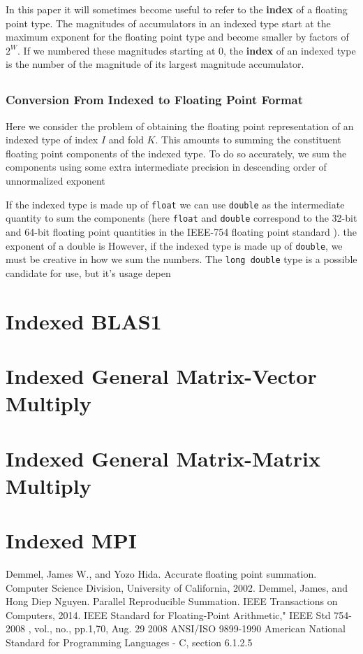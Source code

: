 \documentclass[12pt]{article}
\begin{document}
    In this paper it will sometimes become useful to refer to the \textbf{index} of a floating point type. The magnitudes of accumulators in an indexed type start at the maximum exponent for the floating point type and become smaller by factors of $2^W$. If we numbered these magnitudes starting at 0, the \textbf{index} of an indexed type is the number of the magnitude of its largest magnitude accumulator.
  \subsection{}
    
  \subsubsection{Conversion From Indexed to Floating Point Format}
    Here we consider the problem of obtaining the floating point representation of an indexed type of index $I$ and fold $K$. This amounts to summing the constituent floating point components of the indexed type. To do so accurately, we sum the components using some extra intermediate precision in descending order of unnormalized exponent
    
    If the indexed type is made up of \verb|float| we can use \verb|double| as the intermediate quantity to sum the components (here \verb|float| and \verb|double| correspond to the 32-bit and 64-bit floating point quantities in the IEEE-754 floating point standard \cite{ieee754}). the exponent of a double is However, if the indexed type is made up of \verb|double|, we must be creative in how we sum the numbers. The \verb|long double| type is a possible candidate for use, but it's usage depen
\section{Indexed BLAS1}
\section{Indexed General Matrix-Vector Multiply}
\section{Indexed General Matrix-Matrix Multiply}
\section{Indexed MPI}
\begin{thebibliography}{9}
    Demmel, James W., and Yozo Hida. Accurate floating point summation. Computer Science Division, University of California, 2002.
    Demmel, James, and Hong Diep Nguyen. Parallel Reproducible Summation. IEEE Transactions on Computers, 2014.
    IEEE Standard for Floating-Point Arithmetic," IEEE Std 754-2008 , vol., no., pp.1,70, Aug. 29 2008
    ANSI/ISO 9899-1990 American National Standard for Programming Languages - C, section 6.1.2.5
\end{thebibliography}
\end{document}
